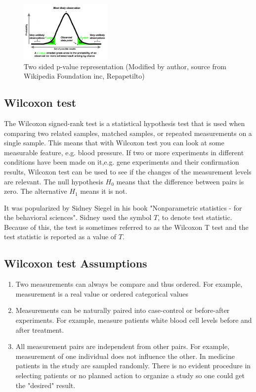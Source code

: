 \documentclass[12pt]{article}
\begin{document}
\begin{figure}[H]
  \centering
  \includegraphics[width=0.4\textwidth]{p_value_two_sided}
  \caption{Two sided p-value representation (Modified by author, source from Wikipedia Foundation inc, Repapetilto)}
  \label{fig:p_value_two_sided}
\end{figure}

\subsection{Wilcoxon test}

The Wilcoxon signed-rank test is a statistical hypothesis test that is used when comparing two related samples, matched samples, or repeated measurements on a single sample. This means that with Wilcoxon test you can look at some measurable feature, e.g. blood pressure. If two or more experiments in different conditions have been made on it,e.g. gene experiments and their confirmation results, Wilcoxon test can be used to see if the changes of the measurement levels are relevant. The null hypothesis $H_0$ means that the difference between pairs is zero. The alternative $H_1$ means it is not.

It was popularized by Sidney Siegel in his book "Nonparametric statistics - for the behavioral sciences". Sidney used the symbol $T$, to denote test statistic. Because of this, the test is sometimes referred to as the Wilcoxon T test and the test statistic is reported as a value of $T$.

\subsection{Wilcoxon test Assumptions}

\begin{enumerate}
  \item Two measurements can always be compare and thus ordered. For example, measurement is a real value or ordered categorical values
  \item Measurements can be naturally paired into case-control or before-after experiments. For example, measure patients white blood cell levels before and after treatment.
  \item All measurement pairs are independent from other pairs. For example, measurement of one individual does not influence the other. In medicine patients in the study are sampled randomly. There is no evident procedure in selecting patients or no planned action to organize a study so one could get the "desired" result.
\end{enumerate}
\end{document}
